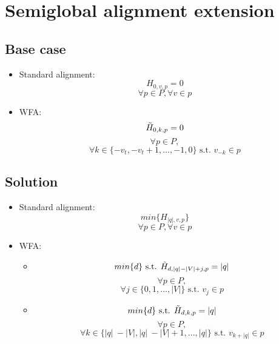 \documentclass{article}
\begin{document}
\section{Semiglobal alignment extension}

\subsection{Base case}
\begin{itemize}
\item Standard alignment:
    \begin{equation}
        H_{0, v, p} = 0
    \end{equation}
    $$\forall p \in P, \forall v \in p$$
    

\item WFA:
    \begin{equation}
        \Tilde{H}_{0, k, p} = 0
    \end{equation}
    $$\forall p \in P,$$ 
    $$\forall k \in \{-v_t, -v_t + 1, ..., -1, 0\} \text{ s.t. } v_{-k} \in p$$
    
\end{itemize}

\subsection{Solution}
\begin{itemize}
\item Standard alignment:
    \begin{equation}
        min \{ H_{\lvert q \rvert, v, p} \}
    \end{equation}
    $$\forall p \in P, \forall v \in p$$
    

\item WFA:
    \begin{itemize}
        \item 
        \begin{equation}
            min \{d\} \text{ s.t. } \Tilde{H}_{d, \lvert q \rvert - \lvert V \rvert + j, p} = \lvert q \rvert
        \end{equation}
        $$\forall p \in P,$$ 
        $$\forall j \in \{0, 1, ..., \lvert V \rvert\} \text{ s.t. } v_j \in p$$

        \item 
        \begin{equation}
            min \{d\} \text{ s.t. } \Tilde{H}_{d, k, p} = \lvert q \rvert
        \end{equation}
        $$\forall p \in P,$$ 
        $$\forall k \in \{\lvert q \rvert\ - \lvert V \rvert, \lvert q \rvert\ - \lvert V \rvert + 1, ..., \lvert q \rvert \} \text{ s.t. } v_{k + \lvert q \rvert} \in p$$
    \end{itemize}
\end{itemize} 
\end{document}
